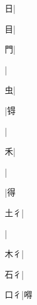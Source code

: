 \begin{multicols}{2}
{{\cjk{}{\cnsym{}　}{\cnsym{}　}日}|{}\par
{\cjk{}{\cnsym{}　}{\cnsym{}　}目}|{}\par
{\cjk{}{\cnsym{}　}{\cnsym{}　}門}|{}\par
{}|{}\par
{\cjk{}{\cnsym{}　}{\cnsym{}　}虫}|{}\par
{}|{\cjk{}锝}\par
{}|{}\par
{\cjk{}{\cnsym{}　}{\cnsym{}　}禾}|{}\par
{}|{}\par
{}|{\cjk{}得}\par
{\cjk{}{\cnsym{}　}土{彳}}|{}\par
{}|{}\par
{\cjk{}{\cnsym{}　}木{彳}}|{}\par
{\cjk{}{\cnsym{}　}石{彳}}|{}\par
{\cjk{}{\cnsym{}　}口{彳}}|{\cjk{}嘚}\par
}
\end{multicols}
